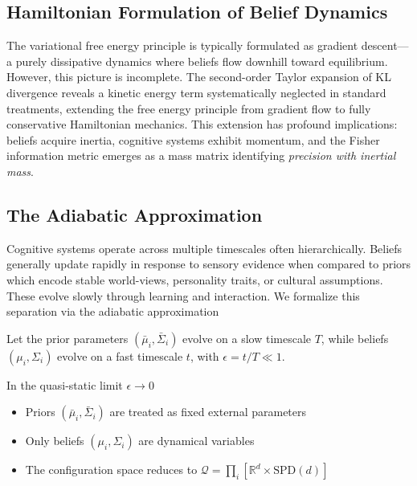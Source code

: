 \documentclass[12pt]{article}
\begin{document}
\subsection{Hamiltonian Formulation of Belief Dynamics}
\label{sec:hamiltonian}

The variational free energy principle is typically formulated as gradient descent—a purely dissipative dynamics where beliefs flow downhill toward equilibrium. However, this picture is incomplete. The second-order Taylor expansion of KL divergence reveals a kinetic energy term systematically neglected in standard treatments, extending the free energy principle from gradient flow to fully conservative Hamiltonian mechanics. This extension has profound implications: beliefs acquire inertia, cognitive systems exhibit momentum, and the Fisher information metric emerges as a mass matrix identifying \emph{precision with inertial mass}.

\subsection{The Adiabatic Approximation}

Cognitive systems operate across multiple timescales often hierarchically. Beliefs generally update rapidly in response to sensory evidence when compared to priors which encode stable world-views, personality traits, or cultural assumptions.  These evolve slowly through learning and interaction. We formalize this separation via the adiabatic approximation

Let the prior parameters $(\bar{\mu}_i, \bar{\Sigma}_i)$ evolve on a slow timescale $T$, while beliefs $(\mu_i, \Sigma_i)$ evolve on a fast timescale $t$, with $\epsilon = t/T \ll 1$. 


In the quasi-static limit $\epsilon \to 0$

\begin{itemize}
    \item Priors $(\bar{\mu}_i, \bar{\Sigma}_i)$ are treated as fixed external parameters
    \item Only beliefs $(\mu_i, \Sigma_i)$ are dynamical variables
    \item The configuration space reduces to $\mathcal{Q} = \prod_i [\mathbb{R}^d \times \mathrm{SPD}(d)]$
\end{itemize}
\end{document}
